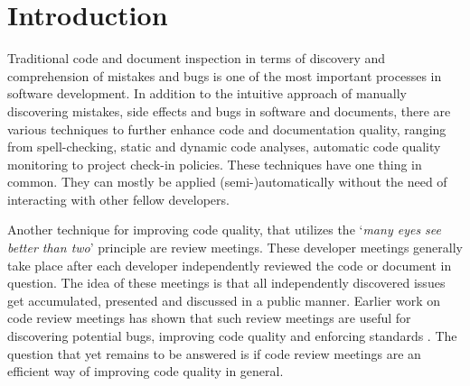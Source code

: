 \section{Introduction}
Traditional code and document inspection in terms of discovery and comprehension of mistakes and bugs is one of the most important processes in software development.
In addition to the intuitive approach of manually discovering mistakes, side effects and bugs in software and documents, there are various techniques to further enhance code and documentation quality, ranging from spell-checking, static and dynamic code analyses, automatic code quality monitoring to project check-in policies.
These techniques have one thing in common. They can mostly be applied (semi-)automatically without the need of interacting with other fellow developers.

Another technique for improving code quality, that utilizes the ‘\textit{many eyes see better than two}’ principle are review meetings.
These developer meetings generally take place after each developer independently reviewed the code or document in question.
The idea of these meetings is that all independently discovered issues get accumulated, presented and discussed in a public manner. 
Earlier work on code review meetings has shown that such review meetings are useful for discovering potential bugs, improving code quality and enforcing standards \cite{Ciolkowski_2003}.
The question that yet remains to be answered is if code review meetings are an efficient way of improving code quality in general.
